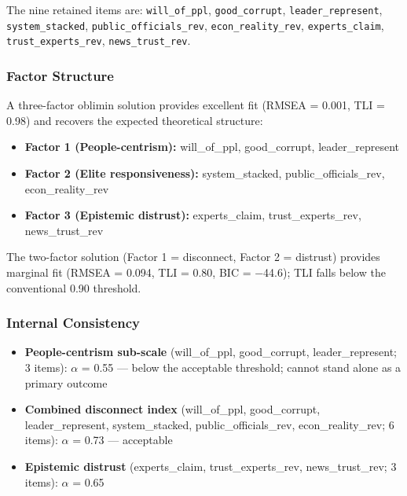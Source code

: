 \documentclass[
  12pt]{article}
\providecommand{\tightlist}{%
  \setlength{\itemsep}{0pt}\setlength{\parskip}{0pt}}
\begin{document}
The nine retained items are: \texttt{will\_of\_ppl},
\texttt{good\_corrupt}, \texttt{leader\_represent},
\texttt{system\_stacked}, \texttt{public\_officials\_rev},
\texttt{econ\_reality\_rev}, \texttt{experts\_claim},
\texttt{trust\_experts\_rev}, \texttt{news\_trust\_rev}.

\subsubsection{Factor Structure}\label{factor-structure}

A three-factor oblimin solution provides excellent fit (RMSEA = 0.001,
TLI = 0.98) and recovers the expected theoretical structure:

\begin{itemize}
\tightlist
\item
  \textbf{Factor 1 (People-centrism):} will\_of\_ppl, good\_corrupt,
  leader\_represent
\item
  \textbf{Factor 2 (Elite responsiveness):} system\_stacked,
  public\_officials\_rev, econ\_reality\_rev
\item
  \textbf{Factor 3 (Epistemic distrust):} experts\_claim,
  trust\_experts\_rev, news\_trust\_rev
\end{itemize}

The two-factor solution (Factor 1 = disconnect, Factor 2 = distrust)
provides marginal fit (RMSEA = 0.094, TLI = 0.80, BIC = −44.6); TLI
falls below the conventional 0.90 threshold.

\subsubsection{Internal Consistency}\label{internal-consistency}

\begin{itemize}
\tightlist
\item
  \textbf{People-centrism sub-scale} (will\_of\_ppl, good\_corrupt,
  leader\_represent; 3 items): \(\alpha\) = 0.55 --- below the
  acceptable threshold; cannot stand alone as a primary outcome
\item
  \textbf{Combined disconnect index} (will\_of\_ppl, good\_corrupt,
  leader\_represent, system\_stacked, public\_officials\_rev,
  econ\_reality\_rev; 6 items): \(\alpha\) = 0.73 --- acceptable
\item
  \textbf{Epistemic distrust} (experts\_claim, trust\_experts\_rev,
  news\_trust\_rev; 3 items): \(\alpha\) = 0.65
\end{itemize}
\end{document}

